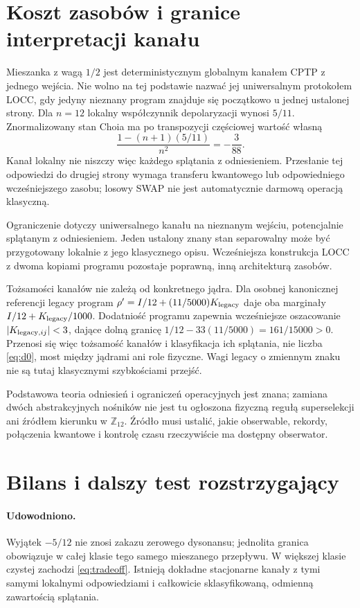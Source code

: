 \documentclass[11pt,a4paper]{article}
\begin{document}
\section{Koszt zasobów i granice interpretacji kanału}

Mieszanka z wagą $1/2$ jest deterministycznym globalnym kanałem CPTP
z jednego wejścia. Nie wolno na tej podstawie nazwać jej uniwersalnym
protokołem LOCC, gdy jedyny nieznany program znajduje się początkowo
u jednej ustalonej strony. Dla $n=12$ lokalny współczynnik depolaryzacji
wynosi $5/11$. Znormalizowany stan Choia ma po transpozycji częściowej
wartość własną
\[
 \frac{1-(n+1)(5/11)}{n^2}=-\frac3{88}.
\]
Kanał lokalny nie niszczy więc każdego splątania z odniesieniem.
Przesłanie tej odpowiedzi do drugiej strony wymaga transferu kwantowego
lub odpowiedniego wcześniejszego zasobu; losowy SWAP nie jest
automatycznie darmową operacją klasyczną.

Ograniczenie dotyczy uniwersalnego kanału na nieznanym wejściu,
potencjalnie splątanym z odniesieniem. Jeden ustalony znany stan
separowalny może być przygotowany lokalnie z jego klasycznego opisu.
Wcześniejsza konstrukcja LOCC z dwoma kopiami programu pozostaje
poprawną, inną architekturą zasobów.

Tożsamości kanałów nie zależą od konkretnego jądra. Dla osobnej
kanonicznej referencji legacy program
$\rho'=I/12+(11/5000)K_{\rm legacy}$ daje oba marginały
$I/12+K_{\rm legacy}/1000$. Dodatniość programu zapewnia wcześniejsze
oszacowanie $|K_{{\rm legacy},ij}|<3$, dające dolną granicę
$1/12-33(11/5000)=161/15000>0$.
Przenosi się więc tożsamość kanałów i klasyfikacja ich splątania,
nie liczba \eqref{eq:d0}, most między jądrami ani role fizyczne.
Wagi legacy o zmiennym znaku nie są tutaj klasycznymi szybkościami przejść.

Podstawowa teoria odniesień i ograniczeń operacyjnych jest znana;
zamiana dwóch abstrakcyjnych nośników nie jest tu ogłoszona
fizyczną regułą superselekcji ani źródłem kierunku w $\mathbb Z_{12}$.
Źródło musi ustalić, jakie obserwable, rekordy, połączenia kwantowe
i kontrolę czasu rzeczywiście ma dostępny obserwator.

\section{Bilans i dalszy test rozstrzygający}

\paragraph{Udowodniono.}
Wyjątek $-5/12$ nie znosi zakazu zerowego dysonansu; jednolita granica
obowiązuje w całej klasie tego samego mieszanego przepływu.
W większej klasie czystej zachodzi \eqref{eq:tradeoff}.
Istnieją dokładne stacjonarne kanały z tymi samymi lokalnymi odpowiedziami
i całkowicie sklasyfikowaną, odmienną zawartością splątania.
\end{document}
